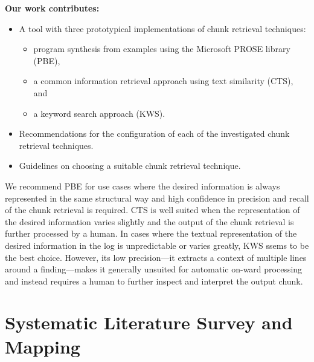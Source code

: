 \noindent
\textbf{Our work contributes:}
\begin{itemize}
  \item A tool with three prototypical implementations of chunk retrieval techniques:
        \begin{itemize}
          \item program synthesis from examples using the Microsoft PROSE library (PBE),
          \item a common information retrieval approach using text similarity (CTS), and
          \item a keyword search approach (KWS).
        \end{itemize}
  \item Recommendations for the configuration of each of the investigated chunk retrieval techniques.
  \item Guidelines on choosing a suitable chunk retrieval technique.
\end{itemize}

We recommend PBE for use cases where the desired information is always
represented in the same structural way and high confidence in precision and
recall of the chunk retrieval is required.
CTS is well suited when the representation of the desired information varies
slightly and the output of the chunk retrieval is further processed by a human.
In cases where the textual representation of the desired information in the log
is unpredictable or varies greatly, KWS ssems to be the best choice. However, its low precision---it extracts a context of multiple lines around a finding---makes it generally unsuited for automatic on-ward processing and instead requires a human to further inspect and interpret the output chunk.


\section{Systematic Literature Survey and Mapping}
\label{sec:survey}

